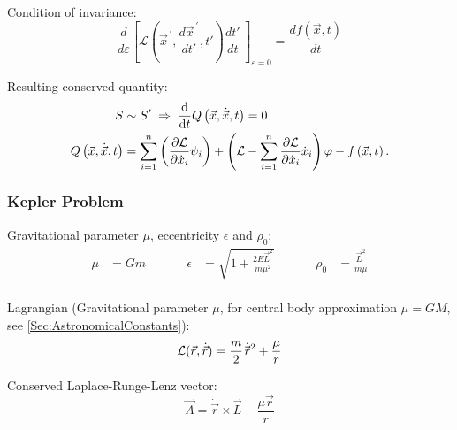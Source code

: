 			\noindent
			Condition of invariance:
			\begin{equation}
				\frac{d}{d\varepsilon}\left[\mathcal{L}\left( {\vec{x}}^{\,\prime},\frac{d {\vec{x}}^{\,\prime}}{dt'},t'\right) \frac{dt'}{dt}\,\right]_{\varepsilon=0}=\frac{df(\vec{x}, t)}{dt}
			\end{equation}

			\noindent
			Resulting conserved quantity:
			\begin{equation}
				\begin{aligned}
					S &\sim S' \;\Rightarrow\;
					\dv{t} Q\left(\vec{x},\dot{\vec{x}},t\right) = 0 \\
					Q\left(\vec{x},\dot{\vec{x}},t\right) &= \sum_{i=1}^{n}\left(\frac{\partial\mathcal{L}}{\partial{\dot{x}}_i}\psi_i\right)+\left(\mathcal{L}-\sum_{i=1}^{n}{\frac{\partial\mathcal{L}}{\partial{\dot{x}}_i}{\dot{x}}_i}\right)\varphi - f\left(\vec{x},t\right).
				\end{aligned}
			\end{equation}

		\subsubsection{Kepler Problem}
			\noindent
			Gravitational parameter  $\mu$, eccentricity $\epsilon$ and $\rho_0$:
			\begin{equation}
				\begin{aligned}
					\mu &= G m &\hspace{30pt}
					\epsilon &= \sqrt{1+\frac{2 E \vec{L}^2}{m \mu^2}} &\hspace{30pt}
					\rho_0 &= \frac{\vec{L}^2}{m\mu} \\
				\end{aligned}
			\end{equation}

			\noindent
			Lagrangian (Gravitational parameter $\mu$, for central body approximation $\mu=GM$, see \ref{Sec:AstronomicalConstants}):
			\begin{equation}
				\mathcal{L}(\vec{r},\dot{\vec{r}}) = \frac{m}{2} \dot{\pvec{r}}^2 + \frac{\mu}{r}
			\end{equation}

			\noindent
			Conserved Laplace-Runge-Lenz vector:
			\begin{equation}
				\vec{A} = \dot{\vec{r}}\times\vec{L} - \frac{\mu \vec{r}}{r}
			\end{equation}

